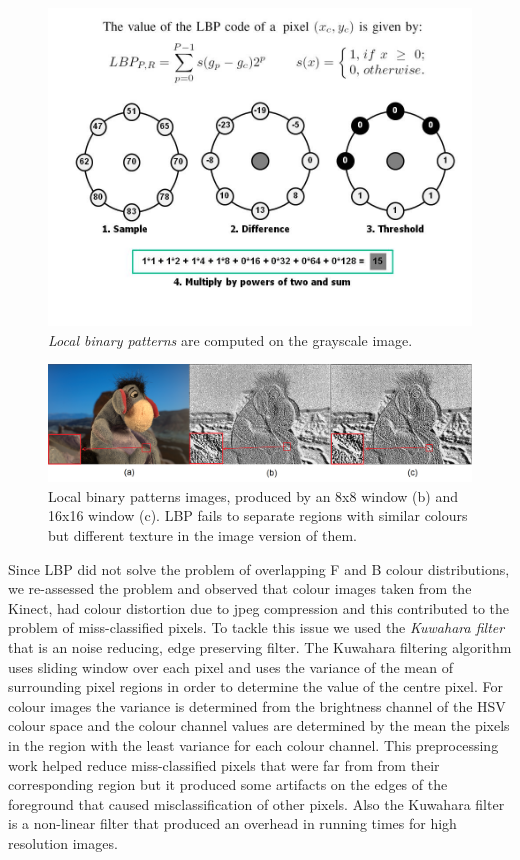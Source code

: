 \begin{figure}[t]
\centering
\includegraphics[width=0.8\columnwidth]{Chapter4/4/lbp.jpg}
\caption[Local binary patterns computation methodology.]{\textit{Local binary patterns} are computed on the grayscale image.}
\label{fig:lbp-m-f}
\end{figure}

\begin{figure}[t]
\centering
\includegraphics[width=1\columnwidth]{Chapter4/4/lbp_figure.jpg}
\caption[Local binary patterns visualization.]{Local binary patterns images, produced by an 8x8 window (b) and 16x16 window (c). LBP fails to separate regions with similar colours but different texture in the image version of them.}
\label{fig:lbp-f}
\end{figure}

Since LBP did not solve the problem of overlapping F and B colour distributions, we re-assessed the problem and observed that colour images taken from the Kinect, had colour distortion due to jpeg compression and this contributed to the problem of miss-classified pixels. To tackle this issue we used the \textit{Kuwahara filter} that is an noise reducing, edge preserving filter. The Kuwahara filtering algorithm uses sliding window over each pixel and uses the variance of the mean of surrounding pixel regions in order to determine the value of the centre pixel. For colour images the variance is determined from the brightness channel of the HSV colour space and the colour channel values are determined by the mean the pixels in the region with the least variance for each colour channel.
This preprocessing work helped reduce miss-classified pixels that were far from from their corresponding region but it produced some artifacts on the edges of the foreground that caused misclassification of other pixels. Also the Kuwahara filter is a non-linear filter that produced an overhead in running times for high resolution images.

